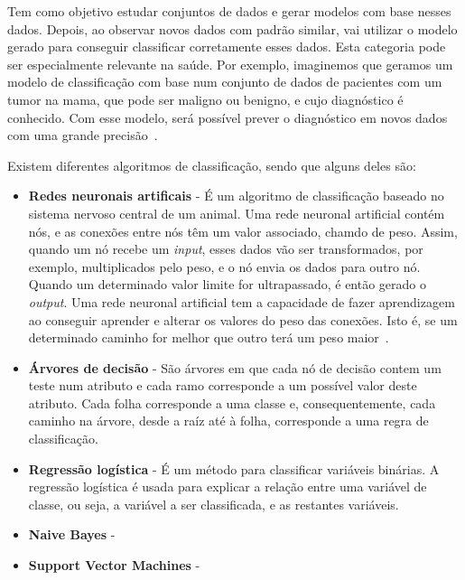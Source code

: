 Tem como objetivo estudar conjuntos de dados e gerar modelos com base nesses dados. Depois, ao observar novos dados com padrão similar, vai utilizar o modelo gerado para conseguir classificar corretamente esses dados. Esta categoria pode ser especialmente relevante na saúde. Por exemplo, imaginemos que geramos um modelo de classificação com base num conjunto de dados de pacientes com um tumor na mama, que pode ser maligno ou benigno, e cujo diagnóstico é conhecido. Com esse modelo, será possível prever o diagnóstico em novos dados com uma grande precisão~\cite{cancerpred}.

Existem diferentes algoritmos de classificação, sendo que alguns deles são:

\begin{itemize}
\item \textbf{Redes neuronais artificais} - É um algoritmo de classificação baseado no sistema nervoso central de um animal. Uma rede neuronal artificial contém nós, e as conexões entre nós têm um valor associado, chamdo de peso. Assim, quando um nó recebe um \textit{input}, esses dados vão ser transformados, por exemplo, multiplicados pelo peso, e o nó envia os dados para outro nó. Quando um determinado valor limite for ultrapassado, é então gerado o \textit{output}. Uma rede neuronal artificial tem a capacidade de fazer aprendizagem ao conseguir aprender e alterar os valores do peso das conexões. Isto é, se um determinado caminho for melhor que outro terá um peso maior~\cite{ann}.

\item \textbf{Árvores de decisão} - São árvores em que cada nó de decisão contem um teste num atributo e cada ramo corresponde a um possível valor deste atributo. Cada folha corresponde a uma classe e, consequentemente, cada caminho na árvore, desde a raíz até à folha, corresponde a uma regra de classificação. 

\item \textbf{Regressão logística} - É um método para classificar variáveis binárias. A regressão logística é usada para explicar a relação entre uma variável de classe, ou seja, a variável a ser classificada, e as restantes variáveis.\newline

\item \textbf{Naive Bayes} - 

\item \textbf{Support Vector Machines} -
\end{itemize}

